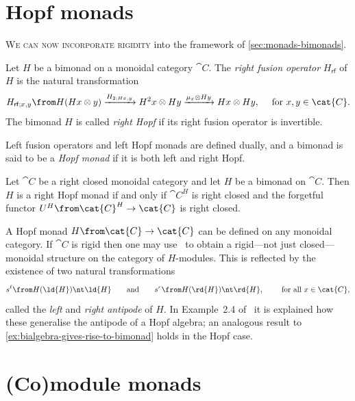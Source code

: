 \section{Hopf monads}\label{sec:hopf-monads}

\textsc{We can now incorporate rigidity} into the framework of \cref{sec:monads-bimonads}.

\begin{definition}\label{fusioninclusion}
  Let \(H\) be a bimonad on a monoidal category \(\cat{C}\).
  The \emph{right fusion operator} \(H_{\mathsf{rf}}\) of \(H\) is the natural transformation
  \[
    {H_{\mathsf{rf};x,y}}\from H(Hx \otimes y)
    \xrightarrow{H_{2;Hx,y}} H^{2}x \otimes Hy
    \xrightarrow{\mu_{x} \otimes Hy} Hx \otimes Hy, \quad\text{ for } x,y \in \cat{C}.
  \]
  The bimonad \(H\) is called \emph{right Hopf} if its right fusion operator is invertible.
\end{definition}

Left fusion operators and left Hopf monads are defined dually,
and a bimonad is said to be a \emph{Hopf monad} if it is both left and right Hopf.

\begin{theorem}
  Let \(\cat{C}\) be a right closed monoidal category and let \(H\) be a bimonad on \(\cat{C}\).
  Then \(H\) is a right Hopf monad if and only if \(\cat{C}^H\) is right closed
  and the forgetful functor \(U^H\from \cat{C}^H \to \cat{C}\) is right closed.
\end{theorem}

A Hopf monad \(H\from \cat{C}\to \cat{C}\) can be defined on any monoidal category.
If \(\cat{C}\) is rigid then one may use~\cite[Lemma~3.4 and Theorem~3.6]{Bruguieres2011}
to obtain a rigid—not just closed—monoidal structure on the category of \(H\)\hyp{}modules.
This is reflected by the existence of two natural transformations
\begin{equation}\label{eq: left_and_right_antipode}
  s^{\ell}\from H(\ld{H}) \nt \ld{H}
  \qquad\text{and}\qquad
  s^{r}\from H(\rd{H}) \nt \rd{H}, \qquad \text{ for all }x \in \cat{C},
\end{equation}
called the \emph{left} and \emph{right antipode} of \(H\).
In Example~2.4 of~\cite{Bruguieres2012} it is explained how these generalise the antipode of a Hopf algebra;
an analogous result to \cref{ex:bialgebra-gives-rise-to-bimonad} holds in the Hopf case.

\section{(Co)module monads}\label{sec:comodule-monads}


